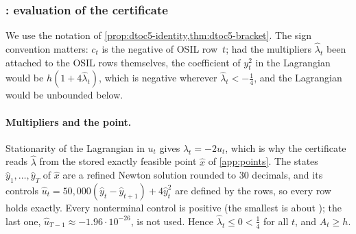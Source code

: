 \subsubsection{: evaluation of the certificate}\label{app:dtoc5-proof}

We use the notation of \cref{prop:dtoc5-identity,thm:dtoc5-bracket}.
The sign convention matters: $c_t$ is the negative of OSIL row~$t$; had the multipliers $\hat\lambda_t$ been attached to the OSIL rows themselves, the coefficient of $y_t^2$ in the Lagrangian would be $h(1+4\hat\lambda_t)$, which is negative wherever $\hat\lambda_t<-\tfrac14$, and the Lagrangian would be unbounded below.

\paragraph{Multipliers and the point.}
Stationarity of the Lagrangian in $u_t$ gives $\lambda_t=-2u_t$, which is why the certificate reads $\hat\lambda$ from the stored exactly feasible point $\hat x$ of \cref{app:points}.
The states $\hat y_1,\dots,\hat y_T$ of $\hat x$ are a refined Newton solution rounded to 30 decimals, and its controls $\hat u_t=50{,}000(\hat y_t-\hat y_{t+1})+4\hat y_t^2$ are defined by the rows, so every row holds exactly.
Every nonterminal control is positive (the smallest is about ); the last one, $\hat u_{T-1}\approx-1.96\cdot10^{-26}$, is not used.
Hence $\hat\lambda_t\le0<\tfrac14$ for all $t$, and $A_t\ge h$.

